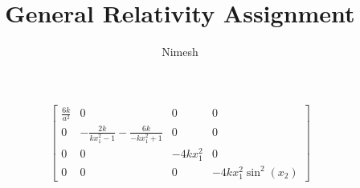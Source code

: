 \documentclass{article}
\title{General Relativity Assignment}
\author{Nimesh}
\begin{document}
$$\left[\begin{matrix}\frac{6 k}{a^{2}} & 0 & 0 & 0\\0 & - \frac{2 k}{k x_{1}^{2} - 1} - \frac{6 k}{- k x_{1}^{2} + 1} & 0 & 0\\0 & 0 & - 4 k x_{1}^{2} & 0\\0 & 0 & 0 & - 4 k x_{1}^{2} \sin^{2}{\left(x_{2} \right)}\end{matrix}\right]$$
\end{document}

